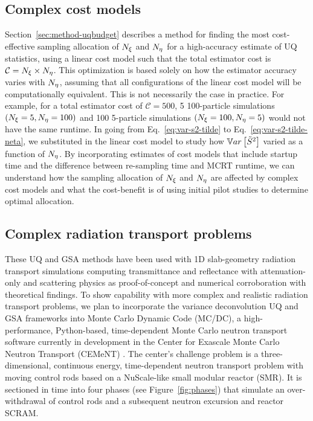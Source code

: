 \subsection{Complex cost models}
Section~\ref{sec:method-uqbudget} describes a method for finding the most cost-effective sampling allocation of ${N_\xi}$ and ${N_\eta}$ for a high-accuracy estimate of UQ statistics, using a linear cost model such that the total estimator cost is $\mathcal{C} = {N_\xi} \times {N_\eta}$. This optimization is based solely on how the estimator accuracy varies with ${N_\eta}$, assuming that all configurations of the linear cost model will be computationally equivalent. This is not necessarily the case in practice. For example, for a total estimator cost of $\mathcal{C} = 500$, 5 100-particle simulations $({N_\xi}=5, {N_\eta}=100)$ and 100 5-particle simulations $({N_\xi}=100, {N_\eta}=5)$ would not have the same runtime. In going from Eq.~\eqref{eq:var-s2-tilde} to Eq.~\eqref{eq:var-s2-tilde-neta}, we substituted in the linear cost model to study how $\mathbb{V}ar\left[\tilde{S}^2\right]$ varied as a function of ${N_\eta}$. By incorporating estimates of cost models that include startup time and the difference between re-sampling time and MCRT runtime, we can understand how the sampling allocation of ${N_\xi}$ and ${N_\eta}$ are affected by complex cost models and what the cost-benefit is of using initial pilot studies to determine optimal allocation.

\subsection{Complex radiation transport problems}
These UQ and GSA methods have been used with 1D slab-geometry radiation transport simulations computing transmittance and reflectance with attenuation-only and scattering physics as proof-of-concept and numerical corroboration with theoretical findings. To show capability with more complex and realistic radiation transport problems, we plan to incorporate the variance deconvolution UQ and GSA frameworks into Monte Carlo Dynamic Code (MC/DC), a high-performance, Python-based, time-dependent Monte Carlo neutron transport software currently in development in the Center for Exascale Monte Carlo Neutron Transport (CEMeNT) \cite{mcdc}. The center's challenge problem is a three-dimensional, continuous energy, time-dependent neutron transport problem with moving control rods based on a NuScale-like small modular reactor (SMR). It is sectioned in time into four phases (see Figure~\ref{fig:phases}) that simulate an over-withdrawal of control rods and a subsequent neutron excursion and reactor SCRAM.


